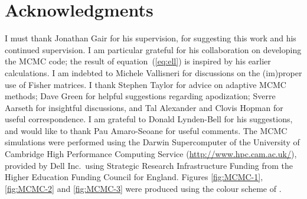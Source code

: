 \documentclass[a4paper, 10pt, titlepage, twoside]{article}
\newcommand{\eqnref}[1]{equation~(\ref{eq:#1})}
\begin{document}
\setcounter{page}{1}





\section*{Acknowledgments}

I must thank Jonathan Gair for his supervision, for suggesting this work and his continued supervision. I am particular grateful for his collaboration on developing the MCMC code; the result of \eqnref{ell} is inspired by his earlier calculations. I am indebted to Michele Vallisneri for discussions on the (im)proper use of Fisher matrices. I thank Stephen Taylor for advice on adaptive MCMC methods; Dave Green for helpful suggestions regarding apodization; Sverre Aarseth for insightful discussions, and Tal Alexander and Clovis Hopman for useful correspondence. I am grateful to Donald Lynden-Bell for his suggestions, and would like to thank Pau Amaro-Seoane for useful comments. The MCMC simulations were performed using the Darwin Supercomputer of the University of Cambridge High Performance Computing Service (\url{http://www.hpc.cam.ac.uk/}), provided by Dell Inc.\ using Strategic Research Infrastructure Funding from the Higher Education Funding Council for England. Figures \ref{fig:MCMC-1}, \ref{fig:MCMC-2} and \ref{fig:MCMC-3} were produced using the colour scheme of \citet{Green2011}.

\newpage




\newpage

\appendix


\end{document}
